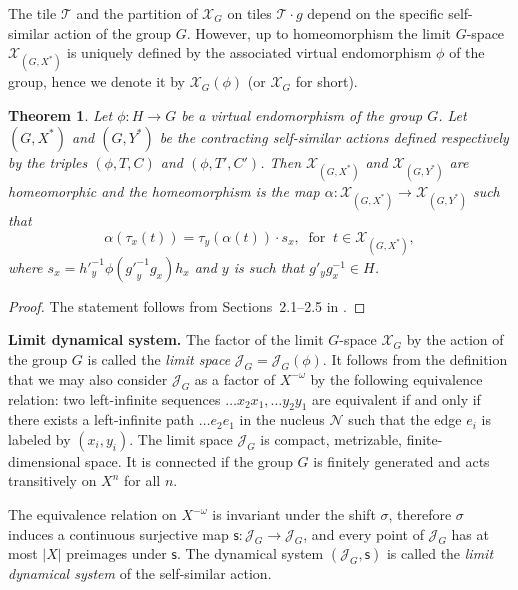\documentclass[12pt]{article}
\newcommand{\xmo}{X^{-\omega}}
\newcommand{\limGs}[1][G]{\mathcal{X}_{#1}}
\newcommand{\lims}[1][G]{\mathscr{J}_{#1}}
\newcommand{\si}{\mathsf{s}}
\newcommand{\tile}{\mathscr{T}}
\newcommand{\nucl}{\mathcal{N}}
\newtheorem{theor}{Theorem}
\theoremstyle{definition}
\begin{document}


The tile $\tile$ and the partition of $\limGs$ on tiles $\tile\cdot g$ depend on the specific
self-similar action of the group $G$. However, up to homeomorphism the limit $G$-space
$\limGs[(G,X^*)]$ is uniquely defined by the associated virtual endomorphism $\phi$ of the group,
hence we denote it by $\limGs[G](\phi)$ (or $\limGs$ for short).

\begin{theor}\label{theor_limsX hom limsY}
Let $\phi: H\rightarrow G$ be a virtual endomorphism of the group $G$. Let $(G,X^*)$ and $(G,Y^*)$
be the contracting self-similar actions defined respectively by the triples $(\phi,T,C)$ and
$(\phi,T',C')$. Then $\limGs[(G,X^*)]$ and $\limGs[(G,Y^*)]$ are homeomorphic and the homeomorphism
is the map $\alpha : \limGs[(G,X^*)] \longrightarrow \limGs[(G,Y^*)]$ such that
\[
\alpha(\tau_x(t))=\tau_y(\alpha(t))\cdot s_x,\ \mbox{ for }\ t\in \limGs[(G,X^*)],
\]
where $s_x={h'}_y^{-1}\phi({g'}_y^{-1}g_x)h_x$ and $y$ is such that $g'_yg_x^{-1}\in H$.
\end{theor}
\begin{proof}
The statement follows from Sections~2.1--2.5 in \cite{self_sim_groups}.
\end{proof}


\textbf{Limit dynamical system.} The factor of the limit $G$-space $\limGs$ by the action of the
group $G$ is called the \textit{limit space} $\lims=\lims(\phi)$. It follows from the definition
that we may also consider $\lims$ as a factor of $\xmo$ by the following equivalence relation: two
left-infinite sequences $\ldots x_2 x_1,\ldots y_2 y_1$ are equivalent if and only if there exists
a left-infinite path $\ldots e_2 e_1$ in the nucleus $\nucl$ such that the edge $e_i$ is labeled by
$(x_i,y_i)$. The limit space $\lims$ is compact, metrizable, finite-dimensional space. It is
connected if the group $G$ is finitely generated and acts transitively on $X^n$ for all $n$.



The equivalence relation on $\xmo$ is invariant under the shift $\sigma$, therefore $\sigma$
induces a continuous surjective map $\si:\lims\rightarrow\lims$, and every point of $\lims$ has at
most $|X|$ preimages under $\si$. The dynamical system $(\lims,\si)$ is called the \textit{limit
dynamical system} of the self-similar action.
\end{document}
